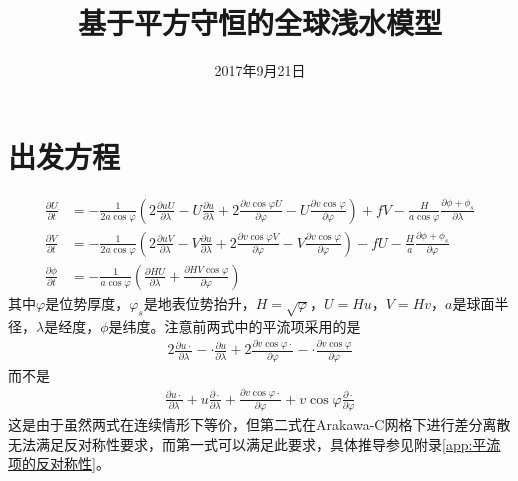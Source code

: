 \documentclass{ctexart}
\title{基于平方守恒的全球浅水模型}
\date{2017年9月21日}
\begin{document}
\maketitle

\section{出发方程}

\begin{align}
	\frac{\partial U}{\partial t} & = - \frac{1}{2 a \cos{\varphi}} \left( 2 \frac{\partial u U}{\partial \lambda} - U \frac{\partial u}{\partial \lambda} + 2 \frac{\partial v \cos{\varphi} U}{\partial \varphi} - U \frac{\partial v \cos{\varphi}}{\partial \varphi} \right) + f V - \frac{H}{a \cos{\varphi}} \frac{\partial \phi + \phi_s}{\partial \lambda} \\
  \frac{\partial V}{\partial t} & = - \frac{1}{2 a \cos{\varphi}} \left( 2 \frac{\partial u V}{\partial \lambda} - V \frac{\partial u}{\partial \lambda} + 2 \frac{\partial v \cos{\varphi} V}{\partial \varphi} - V \frac{\partial v \cos{\varphi}}{\partial \varphi} \right) - f U - \frac{H}{a} \frac{\partial \phi + \phi_s}{\partial \varphi} \\
  \frac{\partial \phi}{\partial t} & = - \frac{1}{a \cos{\varphi}} \left( \frac{\partial H U}{\partial \lambda} + \frac{\partial H V \cos{\varphi}}{\partial \varphi} \right)
\end{align}
其中$\varphi$是位势厚度，$\varphi_s$是地表位势抬升，$H = \sqrt{\varphi}$，$U = H u$，$V = H v$，$a$是球面半径，$\lambda$是经度，$\phi$是纬度。注意前两式中的平流项采用的是
\begin{align}
  2 \frac{\partial u \cdot}{\partial \lambda} - \cdot \frac{\partial u}{\partial \lambda} + 2 \frac{\partial v \cos{\varphi} \cdot}{\partial \varphi} - \cdot \frac{\partial v \cos{\varphi}}{\partial \varphi}
\end{align}
而不是
\begin{align}
  \frac{\partial u \cdot}{\partial \lambda} + u \frac{\partial \cdot}{\partial \lambda} + \frac{\partial v \cos{\varphi} \cdot}{\partial \varphi} + v \cos{\varphi} \frac{\partial \cdot}{\partial \varphi}
\end{align}
这是由于虽然两式在连续情形下等价，但第二式在Arakawa-C网格下进行差分离散无法满足反对称性要求，而第一式可以满足此要求，具体推导参见附录\ref{app:平流项的反对称性}。
\end{document}
